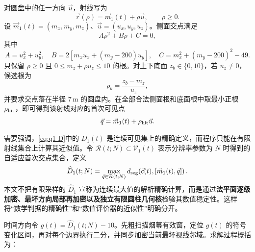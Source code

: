 对圆盘中的任一方向 $\vec u$，射线写为
\[
\vec r(\rho)=\vec m_1(t)+\rho\vec u,
\qquad \rho\ge0.
\]
设 $\vec m_1(t)=(m_x,m_y,m_z)$、$\vec u=(u_x,u_y,u_z)$。侧面交点满足
\begin{equation}
A\rho^2+B\rho+C=0,
\label{eq:cyl-side}
\end{equation}
其中
\[
A=u_x^2+u_y^2,\quad
B=2[m_xu_x+(m_y-200)u_y],\quad
C=m_x^2+(m_y-200)^2-49.
\]
只保留 $\rho\ge0$ 且 $0\le m_z+\rho u_z\le10$ 的根。对上下底面 $z_b\in\{0,10\}$，若 $u_z\ne0$，候选根为
\begin{equation}
\rho_b=\frac{z_b-m_z}{u_z},
\label{eq:cyl-cap}
\end{equation}
并要求交点落在半径 $7\,\mathrm m$ 的圆盘内。在全部合法侧面根和底面根中取最小正根 $\rho_{\rm hit}$，即可得到该射线对应的首次可见点
\begin{equation}
\vec q=\vec m_1(t)+\rho_{\rm hit}\vec u.
\label{eq:first-hit}
\end{equation}

需要强调，\eqref{eq:q1-D}中的 $D_1(t)$ 是连续可见集上的精确定义，而程序只能在有限射线集合上计算其近似值。令 $\mathcal R(t;N)\subset\mathcal V_1(t)$ 表示分辨率参数为 $N$ 时得到的自适应首次交点集合，定义
\begin{equation}
\widehat D_1(t;N)=
\max_{\vec q\in\mathcal R(t;N)}
 d_{\rm seg}\!\left(\vec c(t),[\vec m_1(t),\vec q]\right).
\label{eq:q1-Dhat}
\end{equation}
本文不把有限采样的 $\widehat D_1$ 宣称为连续最大值的解析精确计算，而是通过\textbf{法平面逐级加密、最坏方向局部再加密以及独立有限圆柱几何核}检验其数值稳定性。这样将“数学判据的精确性”和“数值评价器的近似性”明确分开。

时间方向令 $g(t)=\widehat D_1(t;N)-10$。先粗扫描烟幕有效窗，定位 $g(t)$ 的符号变化区间，再对每个边界执行二分，并同步加密当前最坏视线邻域。求解过程概括为：


